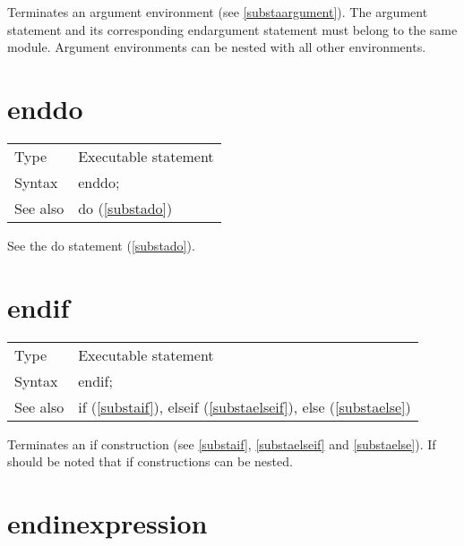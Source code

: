 \noindent Terminates an argument environment 
(see \ref{substaargument}). The argument statement and its 
corresponding endargument statement must belong to the 
same module. Argument environments can be nested with all other 
environments. \vspace{10mm}


\section{enddo}
\label{substaenddo}

\noindent \begin{tabular}{ll}
Type & Executable statement\\
Syntax & enddo;
\\ See also & do (\ref{substado})
\end{tabular} \vspace{4mm}

See the do statement (\ref{substado}).
\vspace{10mm}


\section{endif}
\label{substaendif}

\noindent \begin{tabular}{ll}
Type & Executable statement\\
Syntax & endif;
\\ See also & if (\ref{substaif}),
              elseif (\ref{substaelseif}),
              else (\ref{substaelse})
\end{tabular} \vspace{4mm}

\noindent Terminates an if construction (see \ref{substaif}, 
\ref{substaelseif} and \ref{substaelse}). If should be noted that 
if 
constructions can be nested.
\vspace{10mm}

 
\section{endinexpression}
\label{substaendinexpression}

